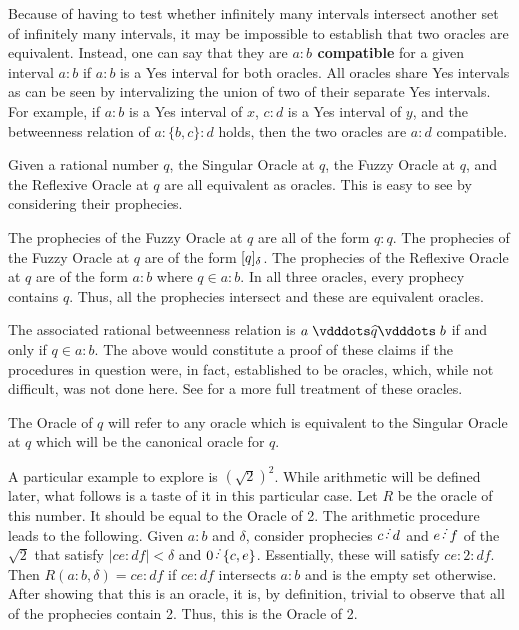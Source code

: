 \documentclass[12pt]{article}
\begin{document}
Because of having to test whether infinitely many intervals intersect another set of infinitely many intervals, it may be impossible to establish that two oracles are equivalent. Instead, one can say that they are \textbf{$a:b$ compatible} for a given interval $a:b$ if $a:b$ is a Yes interval for both oracles. All oracles share Yes intervals as can be seen by intervalizing the union of two of their separate Yes intervals. For example, if $a:b$ is a Yes interval of $x$, $c:d$ is a Yes interval of $y$, and the betweenness relation of $a:\{b,c\}:d$ holds, then the two oracles are $a:d$ compatible.  


 Given a rational number $q$, the Singular Oracle at $q$, the Fuzzy Oracle at $q$, and the Reflexive Oracle at $q$ are all equivalent as oracles. This is easy to see by considering their prophecies. 
 
 The prophecies of the Fuzzy Oracle at $q$ are all of the form $q:q$. The prophecies of the Fuzzy Oracle at $q$ are of the form $[q]_{\delta}$. The prophecies of the Reflexive Oracle at $q$ are of the form $a:b$ where $q \in a:b$. In all three oracles, every prophecy contains $q$. Thus, all the prophecies intersect and these are equivalent oracles. 

The associated rational betweenness relation is $a \xora[q] b$ if and only if $q \in a:b$. The above would constitute a proof of these claims if the procedures in question were, in fact, established to be oracles, which, while not difficult, was not done here. See \cite{taylor23main} for a more full treatment of these oracles. 

The Oracle of $q$ will refer to any oracle which is equivalent to the Singular Oracle at $q$ which will be the canonical oracle for $q$. 

A particular example to explore is $(\sqrt{2})^2$. While arithmetic will be defined later, what follows is a taste of it in this particular case. Let $R$ be the oracle of this number. It should be equal to the Oracle of 2. The arithmetic procedure leads to the following. Given $a:b$ and $\delta$, consider prophecies $c\lte d$ and $e\lte f$ of the $\sqrt{2}$ that satisfy $|ce:df| < \delta$ and $0\lte \{c,e\}$. Essentially, these will satisfy  $ce:2:df$. Then $R(a:b, \delta) = ce:df$ if $ce:df$ intersects $a:b$ and is the empty set otherwise. After showing that this is an oracle, it is, by definition, trivial to observe that all of the prophecies contain 2. Thus, this is the Oracle of 2. 
\end{document}
